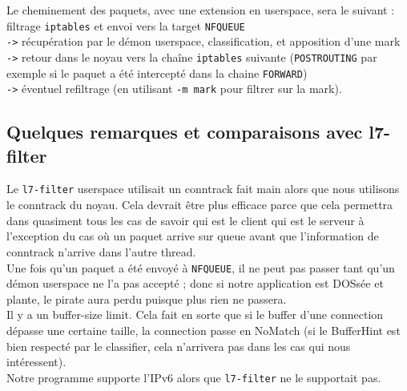 Le cheminement des paquets, avec une extension en userspace, sera le suivant :\\
filtrage \verb+iptables+ et envoi vers la target \verb+NFQUEUE+\\
\verb+->+ récupération par le démon userspace, classification, et apposition d'une mark\\
\verb+->+ retour dans le noyau vers la chaîne \verb+iptables+ suivante (\verb+POSTROUTING+ par exemple si le paquet a été intercepté dans la chaine \verb+FORWARD+)\\
\verb+->+ éventuel refiltrage (en utilisant \verb+-m mark+ pour filtrer sur la mark).


\subsection{Quelques remarques et comparaisons avec l7-filter}
Le \verb+l7-filter+ userspace utilisait un conntrack fait main alors que nous utilisons le conntrack du noyau. Cela devrait être plus efficace parce que cela permettra dans quasiment tous les cas de savoir qui est le client qui est le serveur à l'exception du cas où un paquet arrive sur \og queue \fg{} avant que l'information de conntrack n'arrive dans l'autre thread.\\

Une fois qu'un paquet a été envoyé à \verb+NFQUEUE+, il ne peut pas passer
tant qu'un démon userspace ne l'a pas accepté ; donc si notre application est
DOSsée et plante, le pirate aura perdu puisque plus rien ne passera.\\

Il y a un buffer-size limit. Cela fait en sorte que si le
buffer d'une connection dépasse une certaine taille, la connection
passe en NoMatch (si le BufferHint est bien respecté par le
classifier, cela n'arrivera pas dans les cas qui nous intéressent).\\

Notre programme supporte l'IPv6 alors que \verb+l7-filter+ ne le supportait pas.
